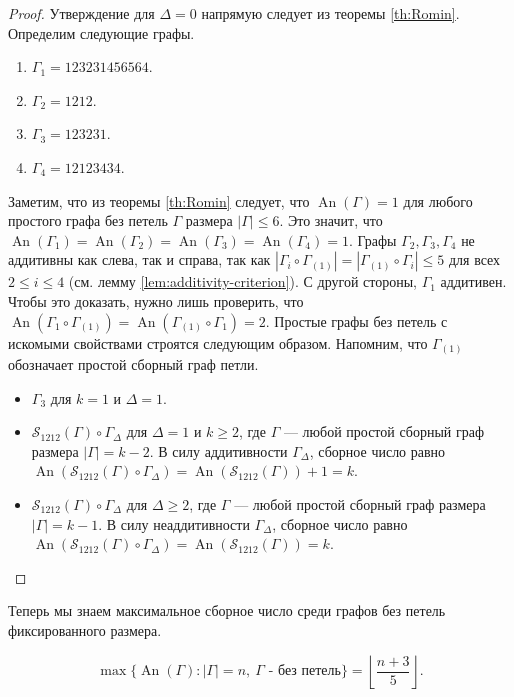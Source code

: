 \documentclass{article}
\theoremstyle{definition}
\newcommand{\An}{\operatorname{An}}
\newcommand{\D}{\Delta}
\begin{document}
\begin{proof}
    Утверждение для $\D = 0$ напрямую следует из теоремы \ref{th:Romin}. Определим следующие графы.

    \begin{enumerate}
        \item $\Gamma_1 = 123231456564$.
        \item $\Gamma_2 = 1212$.
        \item $\Gamma_3 = 123231$.
        \item $\Gamma_4 = 12123434$.
    \end{enumerate}

    Заметим, что из теоремы \ref{th:Romin} следует, что $\An(\Gamma) = 1$ для любого простого графа без петель $\Gamma$ размера $|\Gamma| \leq 6$. Это значит, что $\An(\Gamma_1) = \An(\Gamma_2) = \An(\Gamma_3) = \An(\Gamma_4) = 1$. Графы $\Gamma_2, \Gamma_3, \Gamma_4$ не аддитивны как слева, так и справа, так как $|\Gamma_i \circ \Gamma_{(1)}| = |\Gamma_{(1)} \circ \Gamma_i| \leq 5$ для всех $2 \leq i \leq 4$ (см. лемму \ref{lem:additivity-criterion}). С другой стороны, $\Gamma_1$ аддитивен. Чтобы это доказать, нужно лишь проверить, что $\An(\Gamma_1 \circ \Gamma_{(1)}) = \An(\Gamma_{(1)} \circ \Gamma_1) = 2$. Простые графы без петель с искомыми свойствами строятся следующим образом. Напомним, что $\Gamma_{(1)}$ обозначает простой сборный граф петли.

    \begin{itemize}
        \item $\Gamma_3$ для $k = 1$ и $\D = 1$.
        \item $\mathcal{S}_{1212}(\Gamma) \circ \Gamma_{\D}$ для $\D = 1$ и $k \geq 2$, где $\Gamma$ — любой простой сборный граф размера $|\Gamma| = k - 2$. В силу аддитивности $\Gamma_\D$, сборное число равно $\An(\mathcal{S}_{1212}(\Gamma) \circ \Gamma_{\D}) = \An(\mathcal{S}_{1212}(\Gamma)) + 1 = k$.
        \item $\mathcal{S}_{1212}(\Gamma) \circ \Gamma_{\D}$ для $\D \geq 2$, где $\Gamma$ — любой простой сборный граф размера $|\Gamma| = k - 1$. В силу неаддитивности $\Gamma_\D$, сборное число равно $\An(\mathcal{S}_{1212}(\Gamma) \circ \Gamma_{\D}) = \An(\mathcal{S}_{1212}(\Gamma)) = k$.
    \end{itemize}
\end{proof}

Теперь мы знаем максимальное сборное число среди графов без петель фиксированного размера.

\[
    \max\{\An(\Gamma) : |\Gamma| = n,\ \Gamma \text{ - без петель}\} = \left\lfloor\frac{n + 3}{5}\right\rfloor.
\]
\end{document}
